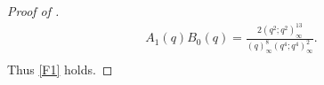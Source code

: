 \documentclass[12pt,reqno]{amsart}
\renewcommand{\(}{\left\(}
\renewcommand{\)}{\right\)}
\numberwithin{equation}{section}
\theoremstyle{plain}
\theoremstyle{definition}
\numberwithin{equation}{section}
\begin{document}
\begin{proof}[Proof of ]
\begin{align*}
A_1(q)B_0(q)%
=\frac{2\left(q^{2};q^2\right)^{13}_{\infty}}{\left(q\right)^8_{\infty} \left(q^{4};q^{4}\right)^2_{\infty}}.\\
\end{align*}
Thus \eqref{F1} holds.\qedhere 

\end{proof}
\end{document}
